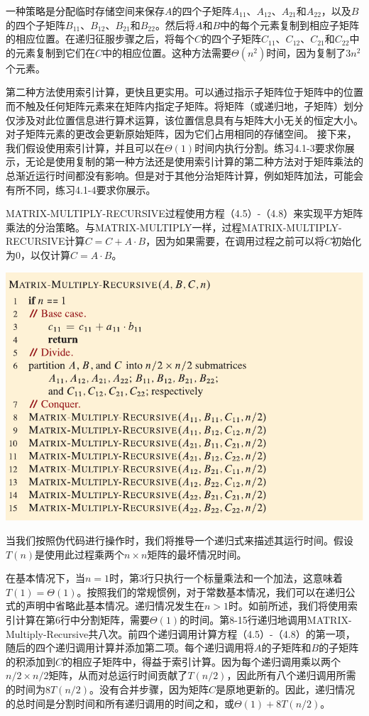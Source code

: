 \documentclass[lang=cn,newtx,10pt,scheme=chinese]{elegantbook}
\begin{document}
一种策略是分配临时存储空间来保存$A$的四个子矩阵$A_{11}$、$A_{12}$、$A_{21}$和$A_{22}$，以及$B$的四个子矩阵$B_{11}$、$B_{12}$、$B_{21}$和$B_{22}$。然后将$A$和$B$中的每个元素复制到相应子矩阵的相应位置。在递归征服步骤之后，将每个$C$的四个子矩阵$C_{11}$、$C_{12}$、$C_{21}$和$C_{22}$中的元素复制到它们在$C$中的相应位置。这种方法需要$\Theta\left(n^2\right)$时间，因为复制了$3n^2$个元素。

第二种方法使用索引计算，更快且更实用。可以通过指示子矩阵位于矩阵中的位置而不触及任何矩阵元素来在矩阵内指定子矩阵。将矩阵（或递归地，子矩阵）划分仅涉及对此位置信息进行算术运算，该位置信息具有与矩阵大小无关的恒定大小。对子矩阵元素的更改会更新原始矩阵，因为它们占用相同的存储空间。
接下来，我们假设使用索引计算，并且可以在$\Theta(1)$时间内执行分割。练习4.1-3要求你展示，无论是使用复制的第一种方法还是使用索引计算的第二种方法对于矩阵乘法的总渐近运行时间都没有影响。但是对于其他分治矩阵计算，例如矩阵加法，可能会有所不同，练习4.1-4要求你展示。

MATRIX-MULTIPLY-RECURSIVE过程使用方程（4.5）-（4.8）来实现平方矩阵乘法的分治策略。与MATRIX-MULTIPLY一样，过程MATRIX-MULTIPLY-RECURSIVE计算$C=C+A \cdot B$，因为如果需要，在调用过程之前可以将$C$初始化为0，以仅计算$C=A \cdot B$。

\includegraphics{算法导论第四版插图/第四章/递归矩阵相乘算法.pdf}

当我们按照伪代码进行操作时，我们将推导一个递归式来描述其运行时间。假设$T(n)$是使用此过程乘两个$n \times n$矩阵的最坏情况时间。

在基本情况下，当$n=1$时，第3行只执行一个标量乘法和一个加法，这意味着$T(1)=\Theta(1)$。按照我们的常规惯例，对于常数基本情况，我们可以在递归公式的声明中省略此基本情况。递归情况发生在$n>1$时。如前所述，我们将使用索引计算在第6行中分割矩阵，需要$\Theta(1)$的时间。第8-15行递归地调用MATRIX-Multiply-Recursive共八次。前四个递归调用计算方程（4.5）-（4.8）的第一项，随后的四个递归调用计算并添加第二项。每个递归调用将$A$的子矩阵和$B$的子矩阵的积添加到$C$的相应子矩阵中，得益于索引计算。因为每个递归调用乘以两个$n/2 \times n/2$矩阵，从而对总运行时间贡献了$T(n/2)$，因此所有八个递归调用所需的时间为$8 T(n/2)$。没有合并步骤，因为矩阵$C$是原地更新的。因此，递归情况的总时间是分割时间和所有递归调用的时间之和，或$\Theta(1)+8 T(n / 2)$。
\end{document}

